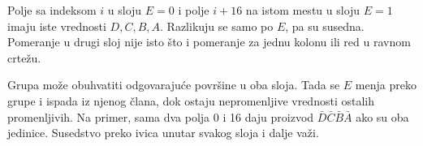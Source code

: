 
Polje sa indeksom \(i\) u sloju \(E=0\) i polje \(i+16\) na istom mestu u sloju \(E=1\) imaju iste vrednosti \(D,C,B,A\). Razlikuju se samo po \(E\), pa su susedna. Pomeranje u drugi sloj nije isto što i pomeranje za jednu kolonu ili red u ravnom crtežu.

Grupa može obuhvatiti odgovarajuće površine u oba sloja. Tada se \(E\) menja preko grupe i ispada iz njenog člana, dok ostaju nepromenljive vrednosti ostalih promenljivih. Na primer, sama dva polja 0 i 16 daju proizvod \(\bar D\bar C\bar B\bar A\) ako su oba jedinice. Susedstvo preko ivica unutar svakog sloja i dalje važi.
